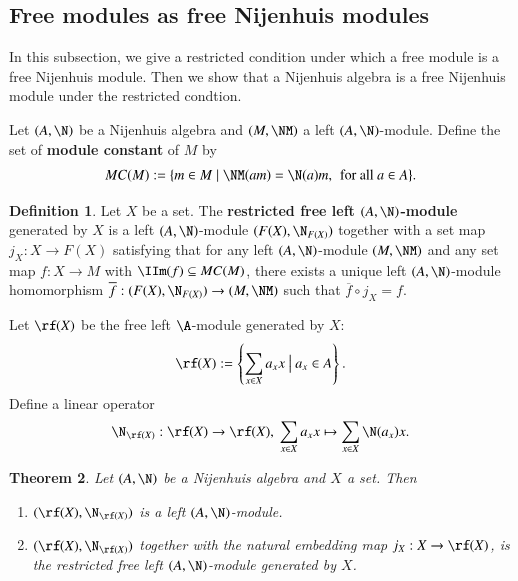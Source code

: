 \documentclass[12pt]{amsart}
\newtheorem{theorem}{Theorem}[section]
\theoremstyle{definition}
\newtheorem{defn}[theorem]{Definition}
\begin{document}
\subsection{Free modules as free Nijenhuis modules} 
In this subsection, we give a restricted condition under which a free module is a free Nijenhuis module. Then we show that a Nijenhuis algebra is a free Nijenhuis module under the restricted condtion.


Let $(A,\N)$ be a Nijenhuis algebra and $(M,\NM)$ a left $(A,\N)$-module. Define the set of {\bf module constant} of $M$ by
\begin{align*}
MC(M):=\{m\in M \mid \NM(am)=\N(a)m, \, \text{ for all } a\in A\}.
\end{align*}

\begin{defn}
Let $X$ be a set. The {\bf restricted free left $(A,\N)$-module} generated by $X$  is a left $(A,\N)$-module $(F(X), \N_{F(X)})$ together with a set map $j_X : X \rightarrow F(X)$ satisfying that for any left $(A,\N)$-module $(M,\NM)$ and any set map $f:X \to M$ with  $\IIm(f) \subseteq MC(M)$, there exists a unique left $(A,\N)$-module homomorphism $\overline{f}: (F(X), \N_{F(X)}) \to (M,\NM)$ such that $\overline{f} \circ j_X=f$.
\end{defn}

Let $\rf(X)$ be the free left $\A$-module generated by $X$:
\begin{align*}
\rf(X):=\left\{\sum_{x\in X}a_{x}x~\big|~a_{x}\in A \right\} .
\end{align*}
Define a linear operator
\begin{align*}
\N_{\rf(X)}: \rf(X) \to \rf(X),\ \sum_{x\in X}a_{x}x \mapsto \sum_{x\in X}\N(a_{x})x.
\end{align*}

\begin{theorem} 
Let $(A,\N)$ be a Nijenhuis algebra and $X$ a set. Then
\begin{enumerate}
\item $(\rf(X),\N_{\rf(X)})$ is a left $(A,\N)$-module. 

\item   $(\rf(X),\N_{\rf(X)})$ together with the natural embedding map $j_X: X\to \rf(X)$,
is the  restricted free left $(A,\N)$-module generated by $X$.
\end{enumerate}
\end{theorem}
\end{document}
